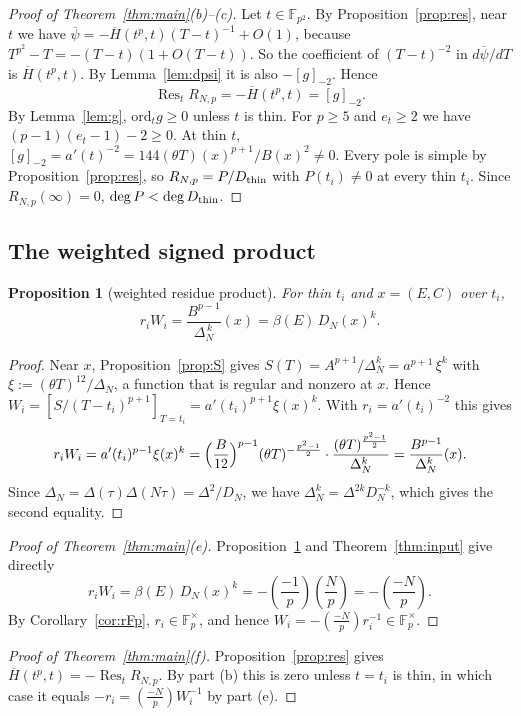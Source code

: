 \documentclass[11pt,a4paper]{article}
\numberwithin{equation}{section}
\newtheorem{proposition}[theorem]{Proposition}
\theoremstyle{definition}
\theoremstyle{remark}
\newcommand{\Fp}{\mathbb F_p}
\newcommand{\Fq}{\mathbb F_{p^2}}
\newcommand{\Res}{\operatorname{Res}}
\newcommand{\Lp}[1]{\left(\frac{#1}{p}\right)}
\begin{document}
\begin{proof}[Proof of Theorem~\ref{thm:main}(b)--(c)]
Let $t\in\Fq$. By Proposition~\ref{prop:res}, near $t$ we have
$\overline\psi=-\overline H(t^p,t)(T-t)^{-1}+O(1)$, because $T^{p^2}-T=-(T-t)(1+O(T-t))$. So the
coefficient of $(T-t)^{-2}$ in $d\overline\psi/dT$ is $\overline H(t^p,t)$. By Lemma~\ref{lem:dpsi}
it is also $-[g]_{-2}$. Hence
\[
\Res_tR_{N,p}=-\overline H(t^p,t)=[g]_{-2}.
\]
By Lemma~\ref{lem:g}, $\mathrm{ord}_tg\ge0$ unless $t$ is thin. For $p\ge5$ and $e_t\ge2$ we have
$(p-1)(e_t-1)-2\ge0$. At thin $t$, $[g]_{-2}=a'(t)^{-2}=144(\theta T)(x)^{p+1}/B(x)^2\ne0$. Every pole is
simple by Proposition~\ref{prop:res}, so $R_{N,p}=P/D_{\rm thin}$ with $P(t_i)\ne0$ at every thin
$t_i$. Since $R_{N,p}(\infty)=0$, $\deg P<\deg D_{\rm thin}$.
\end{proof}

\subsection{The weighted signed product}

\begin{proposition}[weighted residue product]\label{prop:product}
For thin $t_i$ and $x=(E,C)$ over $t_i$,
\[
r_iW_i=\frac{B^{p-1}}{\Delta_N^{\,k}}(x)=\beta(E)\,D_N(x)^k.
\]
\end{proposition}
\begin{proof}
Near $x$, Proposition~\ref{prop:S} gives $S(T)=A^{p+1}/\Delta_N^k=a^{p+1}\,\xi^{k}$ with
$\xi:=(\theta T)^{12}/\Delta_N$, a function that is regular and nonzero at $x$. Hence
$W_i=[S/(T-t_i)^{p+1}]_{T=t_i}=a'(t_i)^{p+1}\xi(x)^k$. With $r_i=a'(t_i)^{-2}$ this gives
\[
r_iW_i=a'(t_i)^{p-1}\xi(x)^k=\Bigl(\frac{B}{12}\Bigr)^{p-1}(\theta T)^{-\frac{p^2-1}2}\cdot
\frac{(\theta T)^{\frac{p^2-1}{2}}}{\Delta_N^{k}}=\frac{B^{p-1}}{\Delta_N^k}(x).
\]
Since $\Delta_N=\Delta(\tau)\Delta(N\tau)=\Delta^2/D_N$, we have
$\Delta_N^k=\Delta^{2k}D_N^{-k}$, which gives the second equality.
\end{proof}

\begin{proof}[Proof of Theorem~\ref{thm:main}(e)]
Proposition~\ref{prop:product} and Theorem~\ref{thm:input} give directly
\[
r_iW_i=\beta(E)\,D_N(x)^k=-\Lp{-1}\Lp N=-\Lp{-N}.
\]
By Corollary~\ref{cor:rFp}, $r_i\in\Fp^\times$, and hence
$W_i=-\Lp{-N}r_i^{-1}\in\Fp^\times$.
\end{proof}

\begin{proof}[Proof of Theorem~\ref{thm:main}(f)]
Proposition~\ref{prop:res} gives
$\overline H(t^p,t)=-\Res_tR_{N,p}$. By part (b) this is zero
unless $t=t_i$ is thin, in which case it equals
$-r_i=\Lp{-N}W_i^{-1}$ by part (e).
\end{proof}
\end{document}
